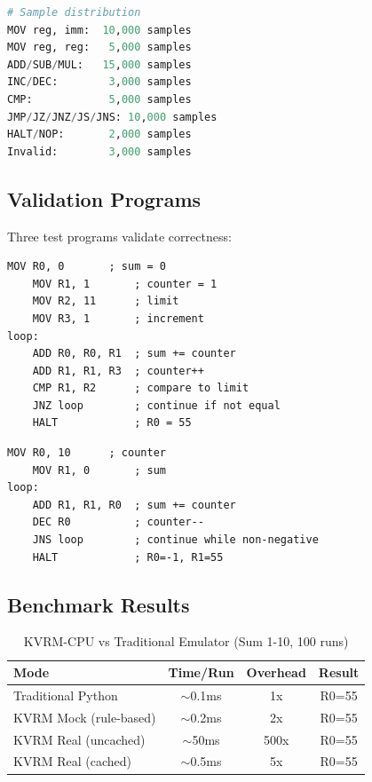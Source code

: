 \documentclass[11pt,a4paper]{article}
\begin{document}
\begin{lstlisting}[language=Python,caption={CPU Training Data Distribution}]
# Sample distribution
MOV reg, imm:  10,000 samples
MOV reg, reg:   5,000 samples
ADD/SUB/MUL:   15,000 samples
INC/DEC:        3,000 samples
CMP:            5,000 samples
JMP/JZ/JNZ/JS/JNS: 10,000 samples
HALT/NOP:       2,000 samples
Invalid:        3,000 samples
\end{lstlisting}

\subsection{Validation Programs}

Three test programs validate correctness:

\begin{lstlisting}[caption={Sum 1 to 10 (Expected: R0=55)}]
    MOV R0, 0       ; sum = 0
    MOV R1, 1       ; counter = 1
    MOV R2, 11      ; limit
    MOV R3, 1       ; increment
loop:
    ADD R0, R0, R1  ; sum += counter
    ADD R1, R1, R3  ; counter++
    CMP R1, R2      ; compare to limit
    JNZ loop        ; continue if not equal
    HALT            ; R0 = 55
\end{lstlisting}

\begin{lstlisting}[caption={Countdown (Tests DEC/JNS, Expected: R0=-1, R1=55)}]
    MOV R0, 10      ; counter
    MOV R1, 0       ; sum
loop:
    ADD R1, R1, R0  ; sum += counter
    DEC R0          ; counter--
    JNS loop        ; continue while non-negative
    HALT            ; R0=-1, R1=55
\end{lstlisting}

\subsection{Benchmark Results}

\begin{table}[h]
\caption{KVRM-CPU vs Traditional Emulator (Sum 1-10, 100 runs)}
\centering
\begin{tabular}{@{}lccc@{}}
\toprule
Mode & Time/Run & Overhead & Result \\
\midrule
Traditional Python & $\sim$0.1ms & 1x & R0=55 \\
KVRM Mock (rule-based) & $\sim$0.2ms & 2x & R0=55 \\
KVRM Real (uncached) & $\sim$50ms & 500x & R0=55 \\
KVRM Real (cached) & $\sim$0.5ms & 5x & R0=55 \\
\bottomrule
\end{tabular}
\end{table}
\end{document}
